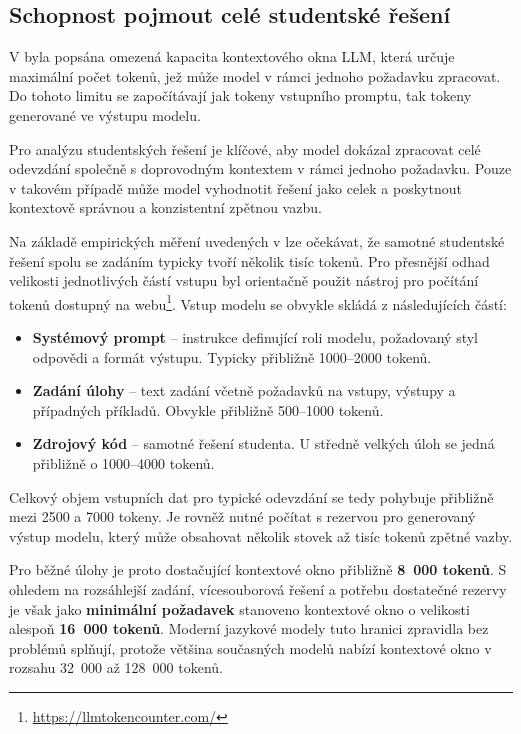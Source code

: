 \subsection{Schopnost pojmout celé studentské řešení}
\label{subsec:criteria-context-window}

V  byla popsána omezená kapacita kontextového okna LLM, která určuje maximální počet tokenů, jež může model v rámci jednoho požadavku zpracovat.
Do tohoto limitu se započítávají jak tokeny vstupního promptu, tak tokeny generované ve výstupu modelu.

Pro analýzu studentských řešení je klíčové, aby model dokázal zpracovat celé odevzdání společně s doprovodným kontextem v rámci jednoho požadavku.
Pouze v takovém případě může model vyhodnotit řešení jako celek a poskytnout kontextově správnou a konzistentní zpětnou vazbu.

Na základě empirických měření uvedených v  lze očekávat, že samotné studentské řešení spolu se zadáním typicky tvoří několik tisíc tokenů.
Pro přesnější odhad velikosti jednotlivých částí vstupu byl orientačně použit nástroj pro počítání tokenů dostupný na webu\footnote{\url{https://llmtokencounter.com/}}.
Vstup modelu se obvykle skládá z následujících částí:

\begin{itemize}
    \item \textbf{Systémový prompt} -- instrukce definující roli modelu, požadovaný styl odpovědi a formát výstupu.
    Typicky přibližně 1000--2000 tokenů.

    \item \textbf{Zadání úlohy} -- text zadání včetně požadavků na vstupy, výstupy a případných příkladů.
    Obvykle přibližně 500--1000 tokenů.

    \item \textbf{Zdrojový kód} -- samotné řešení studenta.
    U středně velkých úloh se jedná přibližně o 1000--4000 tokenů.
\end{itemize}

Celkový objem vstupních dat pro typické odevzdání se tedy pohybuje přibližně mezi 2500 a 7000 tokeny.
Je rovněž nutné počítat s rezervou pro generovaný výstup modelu, který může obsahovat několik stovek až tisíc tokenů zpětné vazby.

Pro běžné úlohy je proto dostačující kontextové okno přibližně \textbf{8~000 tokenů}.
S ohledem na rozsáhlejší zadání, vícesouborová řešení a potřebu dostatečné rezervy je však jako \textbf{minimální požadavek} stanoveno kontextové okno o velikosti alespoň \textbf{16~000 tokenů}.
Moderní jazykové modely tuto hranici zpravidla bez problémů splňují, protože většina současných modelů nabízí kontextové okno v rozsahu 32~000 až 128~000 tokenů.

